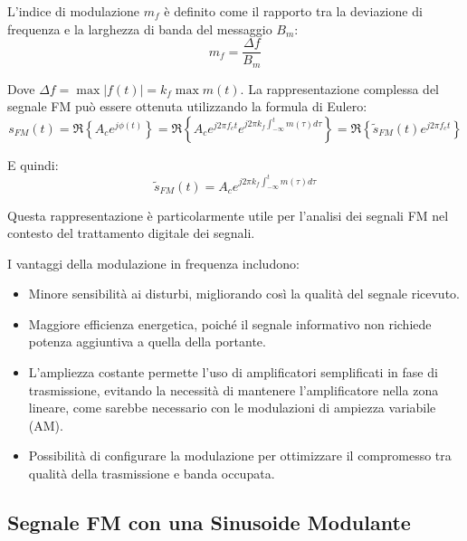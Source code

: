 L'indice di modulazione \( m_f \) è definito come il rapporto tra la deviazione di frequenza e la larghezza di banda del messaggio \( B_m \):
\begin{equation}
    m_f = \frac{\Delta f}{B_m}
\end{equation}

Dove $\Delta f = \max |f(t)| = k_f \max m(t)$.
La rappresentazione complessa del segnale FM può essere ottenuta utilizzando la formula di Eulero:
\begin{equation}
    s_{FM}(t) = \Re \left\{ A_c e^{j\phi(t)} \right\} = \Re \left\{ A_c e^{j2\pi f_c t} e^{j2\pi k_f \int_{-\infty}^{t} m(\tau) d\tau} \right\} = \Re \left\{ \tilde{s}_{FM} (t) e^{j2\pi f_c t} \right\}
\end{equation}

E quindi:
\begin{equation}
    \tilde{s}_{FM}(t) = A_c e^{j2\pi k_f \int_{-\infty}^{t} m(\tau) d\tau}
\end{equation}

Questa rappresentazione è particolarmente utile per l'analisi dei segnali FM nel contesto del trattamento digitale dei segnali.

I vantaggi della modulazione in frequenza includono:
\begin{itemize}
    \item Minore sensibilità ai disturbi, migliorando così la qualità del segnale ricevuto.
    \item Maggiore efficienza energetica, poiché il segnale informativo non richiede potenza aggiuntiva a quella della portante.
    \item L'ampliezza costante permette l'uso di amplificatori semplificati in fase di trasmissione, evitando la necessità di mantenere l'amplificatore nella zona lineare, come sarebbe necessario con le modulazioni di ampiezza variabile (AM).
    \item Possibilità di configurare la modulazione per ottimizzare il compromesso tra qualità della trasmissione e banda occupata.
\end{itemize}



\begin{center}
\end{center}

\subsection*{Segnale FM con una Sinusoide Modulante}

